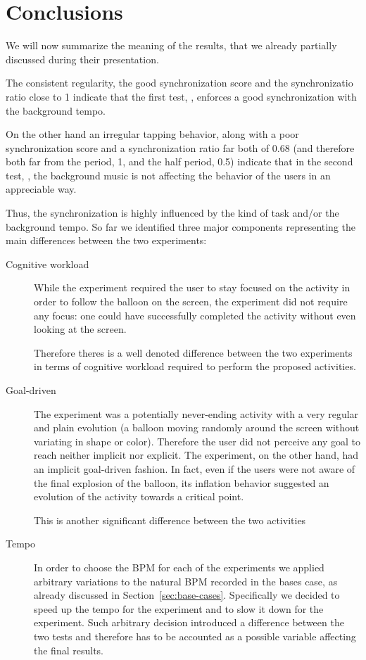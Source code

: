 \section{Conclusions}
\label{sec:conclusions}
We will now summarize the meaning of the results, that we already partially discussed during their presentation.

The consistent regularity, the good synchronization score and the synchronizatio ratio close to 1 indicate that the first test, \testfirst, enforces a good synchronization with the background tempo.

On the other hand an irregular tapping behavior, along with a poor synchronization score and a synchronization ratio far both of 0.68 (and therefore both far from the period, 1, and the half period, 0.5) indicate that in the second test, \testsecond, the background music is not affecting the behavior of the users in an appreciable way.

Thus, the synchronization is highly influenced by the kind of task and/or the background tempo. So far we identified three major components representing the main differences between the two experiments:

\begin{description}
	\item[Cognitive workload] While the \testfirst experiment required the user to stay focused on the activity in order to follow the balloon on the screen, the \testsecond experiment did not require any focus: one could have successfully completed the activity without even looking at the screen.

	Therefore theres is a well denoted difference between the two experiments in terms of cognitive workload required to perform the proposed activities.

	\item[Goal-driven] The \testfirst experiment was a potentially never-ending activity with a very regular and plain evolution (a balloon moving randomly around the screen without variating in shape or color). Therefore the user did not perceive any goal to reach neither implicit nor explicit. The \testsecond experiment, on the other hand, had an implicit goal-driven fashion. In fact, even if the users were not aware of the final explosion of the balloon, its inflation behavior suggested an evolution of the activity towards a critical point.

	This is another significant difference between the two activities

	\item[Tempo] In order to choose the BPM for each of the experiments we applied arbitrary variations to the natural BPM recorded in the bases case, as already discussed in Section~\ref{sec:base-cases}. Specifically we decided to speed up the tempo for the \testfirst experiment and to slow it down for the \testsecond experiment.
	Such arbitrary decision introduced a difference between the two tests and therefore has to be accounted as a possible variable affecting the final results. 
\end{description}

